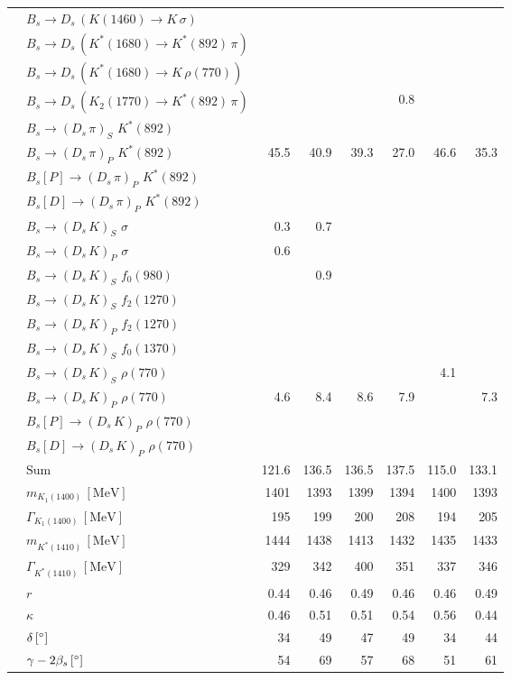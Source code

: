 \begin{tabular}{l l  r  r  r  r  r  r  }
 & $B_s \to D_s \, ( K(1460) \to K \, \sigma )$ &  &  &  &  &  &  \\ 
 & $B_s \to D_s \, ( K^{*}(1680) \to K^{*}(892) \, \pi )$ &  &  &  &  &  &  \\ 
 & $B_s \to D_s \, ( K^{*}(1680) \to K \, \rho(770) )$ &  &  &  &  &  &  \\ 
 & $B_s \to D_s \, ( K_2(1770) \to K^{*}(892) \, \pi )$ &  &  &  & 0.8 &  &  \\ 
 & $B_s \to ( D_s \, \pi)_{S} \, \, K^{*}(892)$ &  &  &  &  &  &  \\ 
 & $B_s \to ( D_s \, \pi)_{P} \, \, K^{*}(892)$ & 45.5 & 40.9 & 39.3 & 27.0 & 46.6 & 35.3 \\ 
 & $B_s[P] \to ( D_s \, \pi)_{P} \, \, K^{*}(892)$ &  &  &  &  &  &  \\ 
 & $B_s[D] \to ( D_s \, \pi)_{P} \, \, K^{*}(892)$ &  &  &  &  &  &  \\ 
 & $B_s \to ( D_s \, K)_{S} \, \, \sigma$ & 0.3 & 0.7 &  &  &  &  \\ 
 & $B_s \to ( D_s \, K)_{P} \, \, \sigma$ & 0.6 &  &  &  &  &  \\ 
 & $B_s \to ( D_s \, K)_{S} \, \, f_0(980)$ &  & 0.9 &  &  &  &  \\ 
 & $B_s \to ( D_s \, K)_{S} \, \, f_2(1270)$ &  &  &  &  &  &  \\ 
 & $B_s \to ( D_s \, K)_{P} \, \, f_2(1270)$ &  &  &  &  &  &  \\ 
 & $B_s \to ( D_s \, K)_{S} \, \, f_0(1370)$ &  &  &  &  &  &  \\ 
 & $B_s \to ( D_s \, K)_{S} \, \, \rho(770)$ &  &  &  &  & 4.1 &  \\ 
 & $B_s \to ( D_s \, K)_{P} \, \, \rho(770)$ & 4.6 & 8.4 & 8.6 & 7.9 &  & 7.3 \\ 
 & $B_s[P] \to ( D_s \, K)_{P} \, \, \rho(770)$ &  &  &  &  &  &  \\ 
 & $B_s[D] \to ( D_s \, K)_{P} \, \, \rho(770)$ &  &  &  &  &  &  \\ 
 & $\text{Sum}$ & 121.6 & 136.5 & 136.5 & 137.5 & 115.0 & 133.1 \\ 
\hline
 & $m_{K_1(1400)} \, [\text{MeV}]$ & 1401 & 1393 & 1399 & 1394 & 1400 & 1393 \\ 
 & $\Gamma_{K_1(1400)} \, [\text{MeV}]$ & 195 & 199 & 200 & 208 & 194 & 205 \\ 
 & $m_{K^{*}(1410)} \, [\text{MeV}]$ & 1444 & 1438 & 1413 & 1432 & 1435 & 1433 \\ 
 & $\Gamma_{K^{*}(1410)} \, [\text{MeV}]$ & 329 & 342 & 400 & 351 & 337 & 346 \\ 
 & $r$ & 0.44 & 0.46 & 0.49 & 0.46 & 0.46 & 0.49 \\ 
 & $\kappa$ & 0.46 & 0.51 & 0.51 & 0.54 & 0.56 & 0.44 \\ 
 & $\delta \, [^{\circ}]$ & 34 & 49 & 47 & 49 & 34 & 44 \\ 
 & $\gamma - 2 \beta_{s} \, [^{\circ}]$ & 54 & 69 & 57 & 68 & 51 & 61 \\ 
\bottomrule
\end{tabular}
